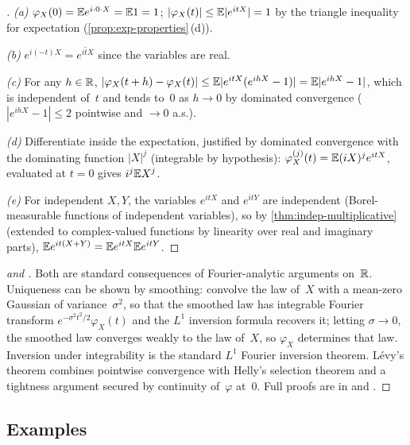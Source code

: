 \begin{proof}[]
\emph{(a)} $\varphi_X(0) = \mathbb{E} e^{i \cdot 0 \cdot X} = \mathbb{E} 1 = 1$;
$|\varphi_X(t)| \leq \mathbb{E} |e^{itX}| = 1$ by the triangle inequality
for expectation (\cref{prop:exp-properties}\,(d)).

\emph{(b)} $e^{i(-t)X} = \overline{e^{itX}}$ since the variables
are real.

\emph{(c)} For any $h \in \mathbb{R}$,
$|\varphi_X(t + h) - \varphi_X(t)| \leq \mathbb{E} |e^{itX} (e^{ihX} - 1)| = \mathbb{E} |e^{ihX} - 1|$,
which is independent of~$t$ and tends to~$0$ as $h \to 0$ by
dominated convergence ($|e^{ihX} - 1| \leq 2$ pointwise and
$\to 0$ a.s.).

\emph{(d)} Differentiate inside the expectation, justified by
dominated convergence with the dominating function $|X|^j$
(integrable by hypothesis): $\varphi_X^{(j)}(t) = \mathbb{E} (iX)^j e^{itX}$,
evaluated at $t = 0$ gives $i^j \mathbb{E} X^j$.

\emph{(e)} For independent $X, Y$, the variables $e^{itX}$ and
$e^{itY}$ are independent (Borel-measurable functions of independent
variables), so by \cref{thm:indep-multiplicative} (extended to
complex-valued functions by linearity over real and imaginary parts),
$\mathbb{E} e^{it(X + Y)} = \mathbb{E} e^{itX} \mathbb{E} e^{itY}$.
\end{proof}

\begin{proof}[ and ]
Both are standard consequences of Fourier-analytic arguments on~$\mathbb{R}$.
Uniqueness can be shown by smoothing: convolve the law of~$X$ with a
mean-zero Gaussian of variance~$\sigma^2$, so that the smoothed law has
integrable Fourier transform $e^{-\sigma^2 t^2 / 2} \varphi_X(t)$ and the
$L^1$ inversion formula recovers it; letting $\sigma \to 0$, the smoothed
law converges weakly to the law of~$X$, so $\varphi_X$ determines that
law. Inversion under integrability is the standard $L^1$ Fourier
inversion theorem. Lévy's theorem combines pointwise convergence with
Helly's selection theorem and a tightness argument secured by continuity
of~$\varphi$ at~$0$. Full proofs are in
\cite[Ch.~II, \S~12]{Shiryaev1989} and \cite[Ch.~VIII]{Gnedenko2001}.
\end{proof}

\subsection*{Examples}

